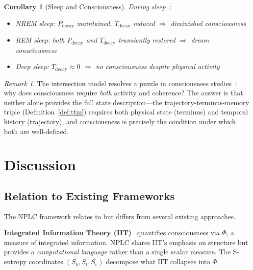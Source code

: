 \documentclass[10pt,twocolumn]{article}
\newtheorem{corollary}[theorem]{Corollary}
\theoremstyle{remark}
\newtheorem{remark}[theorem]{Remark}
\newcommand{\Sk}{S_k}
\newcommand{\St}{S_t}
\newcommand{\Se}{S_e}
\newcommand{\Pdecay}{P_{\mathrm{decay}}}
\newcommand{\Tdecay}{T_{\mathrm{decay}}}
\begin{document}
\begin{corollary}[Sleep and Consciousness]
\label{cor:sleep}
During sleep~\cite{steriade2003neuronal,hobson2000dreaming,diekelmann2010memory}:
\begin{itemize}[noitemsep]
\item NREM sleep: $\Pdecay$ maintained, $\Tdecay$ reduced $\Rightarrow$ diminished consciousness
\item REM sleep: both $\Pdecay$ and $\Tdecay$ transiently restored $\Rightarrow$ dream consciousness
\item Deep sleep: $\Tdecay \approx 0$ $\Rightarrow$ no consciousness despite physical activity
\end{itemize}
\end{corollary}

\begin{remark}
The intersection model resolves a puzzle in consciousness studies~\cite{chalmers1995facing,chalmers1996conscious}: why does consciousness require \emph{both} activity and coherence? The answer is that neither alone provides the full state description---the trajectory-terminus-memory triple (Definition~\ref{def:ttm}) requires both physical state (terminus) and temporal history (trajectory), and consciousness is precisely the condition under which both are well-defined.
\end{remark}

\section{Discussion}
\label{sec:discussion}

\subsection{Relation to Existing Frameworks}

The NPLC framework relates to but differs from several existing approaches.

\textbf{Integrated Information Theory (IIT)}~\cite{tononi2016integrated,tononi2012phi} quantifies consciousness via $\Phi$, a measure of integrated information. NPLC shares IIT's emphasis on structure but provides a \emph{computational language} rather than a single scalar measure. The S-entropy coordinates $(\Sk, \St, \Se)$ decompose what IIT collapses into $\Phi$.
\end{document}
